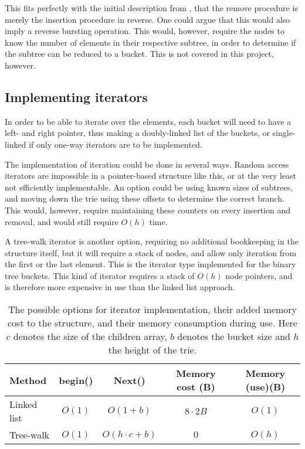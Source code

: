 This fits perfectly with the initial description from \cite{Nash:2008}, that
the remove procedure is merely the insertion procedure in reverse. One could argue
that this would also imply a reverse bursting operation. This would, however,
require the nodes to know the number of elements in their respective subtree,
in order to determine if the subtree can be reduced to a bucket.
This is not covered in this project, however.


\subsection{Implementing iterators}
In order to be able to iterate over the elements, each bucket will need
to have a {\keyword left}- and {\keyword right} pointer, thus making a
doubly-linked list of the buckets, or single-linked if only one-way iterators
are to be implemented.

The implementation of iteration could be done in several ways. Random access
iterators are impossible in a pointer-based structure like this, or at the very
least not efficiently implementable. An option could be using known sizes of
subtrees, and moving down the trie using these offsets to determine the correct
branch. This would, however, require maintaining these counters on every
insertion and removal, and would still require $O(h)$ time.

A tree-walk iterator is another option, requiring no additional bookkeeping in
the structure itself, but it will require a stack of nodes, and allow only
iteration from the first or the last element. This is the iterator type
implemented for the binary tree buckets. This kind of iterator requires a stack
of $O(h)$ node pointers, and is therefore more expensive in use than the linked
list approach.

\begin{table}[h!]
    \centering
    \begin{tabular}[here]{ l | c | c | c | c}
        Method      & begin()  & Next()           & Memory cost (B) & Memory (use)(B) \\ \hline
        Linked list  & $O(1)$ & $O(1 + b) $        & $8\cdot2B$      & $O(1)$ \\
        Tree-walk & $O(1)$ & $O(h \cdot c + b)$   & $0$             & $O(h)$ \\ \hline
    \end{tabular}
    \caption{The possible options for iterator implementation, their added
    memory cost to the structure, and their memory consumption during use. Here
    $c$ denotes the size of the children array, $b$ denotes the bucket size and
    $h$ the height of the trie.}

    \label{tab:stats:iterator}
\end{table}

